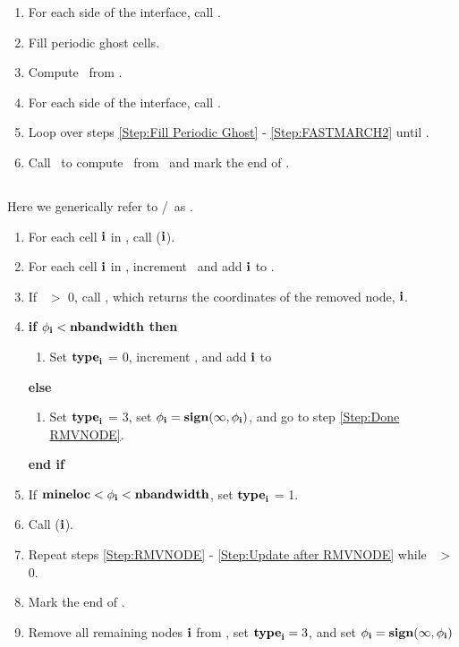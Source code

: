 \begin{enumerate}
\begin{enumerate}
\begin{enumerate}
\end{enumerate}
{\bf end if}\\
\item Clear \nband~by setting \nband(1,:) = -\LARGEINT.
\end{enumerate}
\item For each side of the interface, call \FASTMARCH.
\item \label{Step:Fill Periodic Ghost} Fill periodic ghost cells.
\item Compute \nbandnum~from \nband.
\item \label{Step:FASTMARCH2} For each side of the interface, call .
\item Loop over steps \ref{Step:Fill Periodic Ghost} - \ref{Step:FASTMARCH2} until \done.
\item Call \MINE~to compute \mine~from \type~and mark the end of \mine.
\end{enumerate}
\subsection{\FASTMARCH}
Here we generically refer to \intfacep/\intfacen~as \intface.
\begin{enumerate}
\item For each cell ${\bf i}$ in \intface, call \UPDATE(${\bf i}$).
\item For each cell ${\bf i}$ in \intface, increment \nbandnum~and add ${\bf i}$ to \nband.
\item \label{Step:RMVNODE} If \numtent~$>$ 0, call \RMVNODE, which returns the coordinates of the removed node, ${\bf i}$.
\item {\bf if} $\phi_{\bf i} < {\tt{\bf nbandwidth}}$ {\bf then}
\begin{enumerate}
\item Set ${\tt{\bf type}}_{\bf i}$ = 0, increment \nbandnum, and add ${\bf i}$ to \nband
\end{enumerate}
{\bf else}
\begin{enumerate}
\item Set ${\tt{\bf type}}_{\bf i}$ = 3, set $\phi_{\bf i} = {\tt{\bf sign}}(\infty,\phi_{\bf i})$, and go to step \ref{Step:Done RMVNODE}.
\end{enumerate}
{\bf end if}
\item If ${\tt{\bf mineloc}} < \phi_{\bf i} < {\tt{\bf nbandwidth}}$, set ${\tt{\bf type}}_{\bf i}$ = 1.
\item \label{Step:Update after RMVNODE} Call \UPDATE(${\bf i}$).
\item Repeat steps \ref{Step:RMVNODE} - \ref{Step:Update after RMVNODE} while \numtent~$>$ 0.
\item \label{Step:Done RMVNODE} Mark the end of \nband.
\item Remove all remaining nodes ${\bf i}$ from \heap, set ${\tt{\bf type}}_{\bf i} = 3$, and set $\phi_{\bf i} = {\tt{\bf sign}}(\infty,\phi_{\bf i})$
\end{enumerate}
